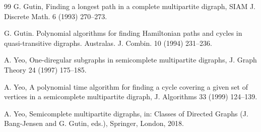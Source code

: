 \documentclass{article}
\newcommand{\2}{\vspace{0.2cm}}
\begin{document}
\begin{thebibliography}{99}
 G. Gutin, Finding a longest path in a complete multipartite digraph, SIAM J. Discrete Math. 6 (1993) 270--273.

  G. Gutin. Polynomial algorithms for finding Hamiltonian paths and cycles in quasi-transitive digraphs. Australas. J. Combin.  10 (1994) 231--236.

 A. Yeo, One-diregular subgraphs in semicomplete multipartite digraphs, J. Graph Theory 24 (1997) 175–185.

 A. Yeo, A polynomial time algorithm for finding a cycle covering a given set of vertices in a semicomplete multipartite digraph, J. Algorithms 33 (1999) 124--139.

 A. Yeo, Semicomplete multipartite digraphs, in: Classes of Directed Graphs (J. Bang-Jensen and G. Gutin, eds.), Springer, London, 2018.


\end{thebibliography}
\end{document}
